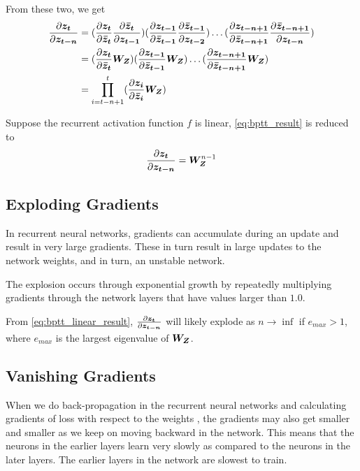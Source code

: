 From these two, we get
\begin{align} \label{eq:bptt_result}
\begin{split}
\frac{\partial \vect{z_t}}{\partial \vect{z_{t-n}}} &= (\frac{\partial \vect{z_t}}{\partial \vect{\bar{z}_{t}}}\frac{\partial \vect{\bar{z}_{t}}}{\partial \vect{z_{t-1}}})
(\frac{\partial \vect{z_{t-1}}}{\partial \vect{\bar{z}_{t-1}}}\frac{\partial \vect{\bar{z}_{t-1}}}{\partial \vect{z_{t-2}}}) \ldots 
(\frac{\partial \vect{z_{t-n+1}}}{\partial \vect{\bar{z}_{t-n+1}}}\frac{\partial \vect{\bar{z}_{t-n+1}}}{\partial \vect{z_{t-n}}}) \\
&= (\frac{\partial \vect{z_t}}{\partial \vect{\bar{z}_{t}}}\matr{W_Z})
(\frac{\partial \vect{z_{t-1}}}{\partial \vect{\bar{z}_{t-1}}}\matr{W_Z}) \ldots 
(\frac{\partial \vect{z_{t-n+1}}}{\partial \vect{\bar{z}_{t-n+1}}}\matr{W_Z}) \\
&= \prod\limits_{i=t-n+1}^{t} (\frac{\partial \vect{z_i}}{\partial \vect{\bar{z}_{i}}}\matr{W_Z})
\end{split}
\end{align}

Suppose the recurrent activation function $f$ is linear, \cref{eq:bptt_result} is reduced to
\begin{equation} \label{eq:bptt_linear_result}
\frac{\partial \vect{z_t}}{\partial \vect{z_{t-n}}} = \matr{W_Z}^{n-1}
\end{equation}


\subsection{Exploding Gradients}
In recurrent neural networks, gradients can accumulate during an update and result in very large gradients. 
These in turn result in large updates to the network weights, and in turn, an unstable network. 

The explosion occurs through exponential growth by repeatedly multiplying gradients through the network layers that have values larger than $1.0$.

From \cref{eq:bptt_linear_result}, $\frac{\partial \vect{z_t}}{\partial \vect{z_{t-n}}}$ will likely explode as $n \rightarrow \inf$ if $e_{max} > 1$, where $e_{max}$ is the largest eigenvalue of $\matr{W_Z}$.

\subsection{Vanishing Gradients}
When we do back-propagation in the recurrent neural networks and calculating gradients of loss with respect to the weights , the gradients may also get smaller and smaller as we keep on moving backward in the network. 
This means that the neurons in the earlier layers learn very slowly as compared to the neurons in the later layers. 
The earlier layers in the network are slowest to train.

